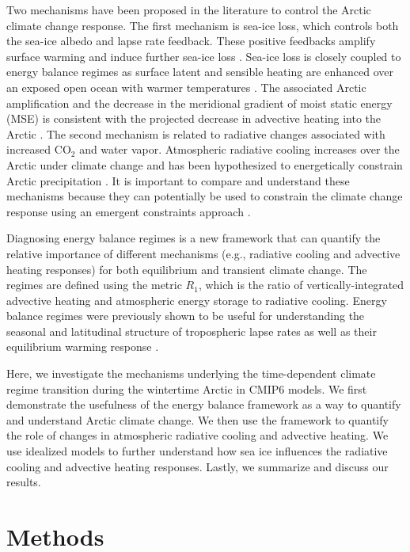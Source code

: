 \documentclass[draft]{agujournal2019}
\begin{document}
Two mechanisms have been proposed in the literature to control the Arctic climate change response. The first mechanism is sea-ice loss, which controls both the sea-ice albedo and lapse rate feedback. These positive feedbacks amplify surface warming and induce further sea-ice loss \cite{pithan2014,feldl2020}. Sea-ice loss is closely coupled to energy balance regimes as surface latent and sensible heating are enhanced over an exposed open ocean with warmer temperatures \cite{taylor2018,feldl2020,shaw2022}. The associated Arctic amplification and the decrease in the meridional gradient of moist static energy (MSE) is consistent with the projected decrease in advective heating into the Arctic \cite{armour2019,feldl2021,shaw2022,cardinale2023}. The second mechanism is related to radiative changes associated with increased CO$_2$ and water vapor. Atmospheric radiative cooling increases over the Arctic under climate change \cite{bintanja2011} and has been hypothesized to energetically constrain Arctic precipitation \cite{pithan2021}. It is important to compare and understand these mechanisms because they can potentially be used to constrain the climate change response using an emergent constraints approach \cite{klein2015}.

Diagnosing energy balance regimes is a new framework that can quantify the relative importance of different mechanisms (e.g., radiative cooling and advective heating responses) for both equilibrium and transient climate change. The regimes are defined using the metric $R_1$, which is the ratio of vertically-integrated advective heating and atmospheric energy storage to radiative cooling. Energy balance regimes were previously shown to be useful for understanding the seasonal and latitudinal structure of tropospheric lapse rates as well as their equilibrium warming response \cite{miyawaki2022}.

Here, we investigate the mechanisms underlying the time-dependent climate regime transition during the wintertime Arctic in CMIP6 models. We first demonstrate the usefulness of the energy balance framework as a way to quantify and understand Arctic climate change. We then use the framework to quantify the role of changes in atmospheric radiative cooling and advective heating. We use idealized models to further understand how sea ice influences the radiative cooling and advective heating responses. Lastly, we summarize and discuss our results.

\section{Methods}
\label{sec:met}
\end{document}
